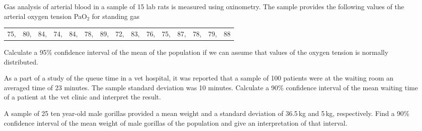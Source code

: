\begin{problem}
  Gas analysis of arterial blood in a sample of 15 lab rats is
  measured using
  oxinometry. The sample provides
  the following values of the arterial oxygen tension PaO$_2$ for standing gas  
  \begin{center}
    \begin{tabular}{*{15}{c}}
   75, &80, &84, & 74, & 84, &78, & 89, & 72, & 83, & 76,& 75,& 87,&
   78, & 79, & 88  
  \end{tabular}

  \end{center}


Calculate a 95\% confidence interval of the mean of the population if
we can assume that  values of the oxygen tension is normally
distributed.  
\end{problem}

\begin{problem}
  As a part of a study of the queue time in a vet hospital, it was
  reported that a sample of
  100 patients were at the waiting room an averaged time of 23
  minutes. The sample standard deviation was 10 minutes. Calculate a
  90\% confidence interval of the mean waiting time of a patient at
  the vet clinic and interpret the result. 

\end{problem}

\begin{problem}
  A sample of 25 ten year-old male gorillas provided a mean weight and a standard deviation of 36.5\,kg and 5\,kg, respectively. Find a 90\% confidence interval of the mean weight of male gorillas of the population and give an interpretation of that interval.

\end{problem}

